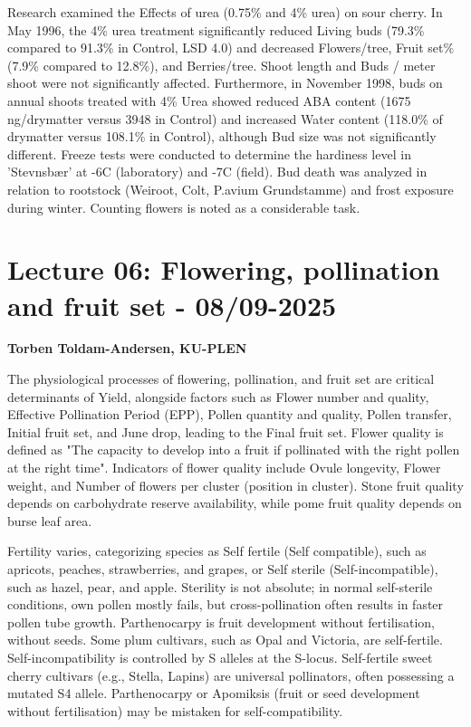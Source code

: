 \vspace{0.5em}
Research examined the Effects of urea (0.75\% and 4\% urea) on sour cherry. In May 1996, the 4\% urea treatment significantly reduced Living buds (79.3\% compared to 91.3\% in Control, LSD 4.0) and decreased Flowers/tree, Fruit set\% (7.9\% compared to 12.8\%), and Berries/tree. Shoot length and Buds / meter shoot were not significantly affected. Furthermore, in November 1998, buds on annual shoots treated with 4\% Urea showed reduced ABA content (1675 ng/drymatter versus 3948 in Control) and increased Water content (118.0\% of drymatter versus 108.1\% in Control), although Bud size was not significantly different. Freeze tests were conducted to determine the hardiness level in 'Stevnsbær' at -6\textdegree C (laboratory) and -7\textdegree C (field). Bud death was analyzed in relation to rootstock (Weiroot, Colt, P.avium Grundstamme) and frost exposure during winter. Counting flowers is noted as a considerable task.


\section{Lecture 06: Flowering, pollination and fruit set - 08/09-2025}
\textbf{Torben Toldam-Andersen, KU-PLEN}

\vspace{1em}
The physiological processes of flowering, pollination, and fruit set are critical determinants of Yield, alongside factors such as Flower number and quality, Effective Pollination Period (EPP), Pollen quantity and quality, Pollen transfer, Initial fruit set, and June drop, leading to the Final fruit set. Flower quality is defined as "The capacity to develop into a fruit if pollinated with the right pollen at the right time". Indicators of flower quality include Ovule longevity, Flower weight, and Number of flowers per cluster (position in cluster). Stone fruit quality depends on carbohydrate reserve availability, while pome fruit quality depends on burse leaf area.

\vspace{0.5em}
Fertility varies, categorizing species as Self fertile (Self compatible), such as apricots, peaches, strawberries, and grapes, or Self sterile (Self-incompatible), such as hazel, pear, and apple. Sterility is not absolute; in normal self-sterile conditions, own pollen mostly fails, but cross-pollination often results in faster pollen tube growth. Parthenocarpy is fruit development without fertilisation, without seeds. Some plum cultivars, such as Opal and Victoria, are self-fertile. Self-incompatibility is controlled by S alleles at the S-locus. Self-fertile sweet cherry cultivars (e.g., Stella, Lapins) are universal pollinators, often possessing a mutated S4 allele. Parthenocarpy or Apomiksis (fruit or seed development without fertilisation) may be mistaken for self-compatibility.

